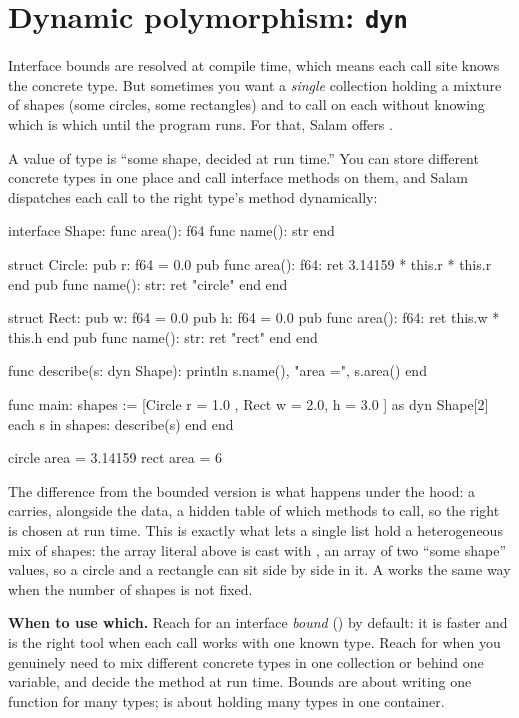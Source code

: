 \section{Dynamic polymorphism: \texttt{dyn}}

Interface bounds are resolved at compile time, which means each call site knows
the concrete type. But sometimes you want a \emph{single} collection holding a
mixture of shapes (some circles, some rectangles) and to call 
on each without knowing which is which until the program runs. For that, Salam
offers .

A value of type  is ``some shape, decided at run time.'' You can
store different concrete types in one place and call interface methods on them,
and Salam dispatches each call to the right type's method dynamically:

\begin{salamen}
interface Shape:
    func area(): f64
    func name(): str
end

struct Circle:
    pub r: f64 = 0.0
    pub func area(): f64: ret 3.14159 * this.r * this.r end
    pub func name(): str: ret "circle" end
end

struct Rect:
    pub w: f64 = 0.0
    pub h: f64 = 0.0
    pub func area(): f64: ret this.w * this.h end
    pub func name(): str: ret "rect" end
end

func describe(s: dyn Shape):
    println s.name(), "area =", s.area()
end

func main:
    shapes := [Circle { r = 1.0 }, Rect { w = 2.0, h = 3.0 }] as dyn Shape[2]
    each s in shapes:
        describe(s)
    end
end
\end{salamen}

\begin{progout}
circle area = 3.14159
rect area = 6
\end{progout}

The difference from the bounded version is what happens under the hood: a
 carries, alongside the data, a hidden table of which methods to
call, so the right  is chosen at run time. This is exactly what lets
a single list hold a heterogeneous mix of shapes: the array literal above is
cast with , an array of two ``some shape'' values, so a
circle and a rectangle can sit side by side in it. A 
works the same way when the number of shapes is not fixed.

\begin{note}
\textbf{When to use which.} Reach for an interface \emph{bound} () by default: it is faster and is the right tool when each call works
with one known type. Reach for  when you genuinely need to mix different
concrete types in one collection or behind one variable, and decide the method at
run time. Bounds are about writing one function for many types;  is
about holding many types in one container.
\end{note}

